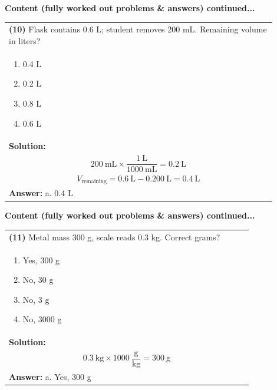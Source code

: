 \documentclass{article}
\begin{document}
{\newpage
\noindent
{\large\textbf{Content (fully worked out problems \& answers) continued...}}\\[0.2em]
\vspace{0.2cm}
\begin{tabular}{|p{0.9\linewidth}|}
\hline
\vspace{0.2cm}
\textbf{(10)} Flask contains 0.6 L; student removes 200 mL. Remaining volume in liters? \\
\begin{minipage}[t]{0.85\linewidth}
\begin{enumerate}[label=\alph*.]
   \item 0.4 L
   \item 0.2 L
   \item 0.8 L
   \item 0.6 L
\end{enumerate}
\end{minipage}\\
\hline
\vspace{0.2cm}
\textbf{Solution:} \\
\[
200~\text{mL} \times \frac{1~\text{L}}{1000~\text{mL}} = 0.2~\text{L}
\] \\
\[
V_\text{remaining} = 0.6~\text{L} - 0.200~\text{L} = 0.4~\text{L}
\] \\ 
\hline
\vspace{0.2cm}
\textbf{Answer:} a. 0.4 L \\
\hline
\end{tabular}

\newpage
\noindent
{\large\textbf{Content (fully worked out problems \& answers) continued...}}\\[0.2em]
\vspace{0.2cm}
\begin{tabular}{|p{0.9\linewidth}|}
\hline
\vspace{0.2cm}
\textbf{(11)} Metal mass 300 g, scale reads 0.3 kg. Correct grams? \\
\begin{minipage}[t]{0.85\linewidth}
\begin{enumerate}[label=\alph*.]
   \item Yes, 300 g
   \item No, 30 g
   \item No, 3 g
   \item No, 3000 g
\end{enumerate}
\end{minipage}\\
\hline
\vspace{0.2cm}
\textbf{Solution:} \\
\[
0.3~\text{kg} \times 1000~\frac{\text{g}}{\text{kg}} = 300~\text{g}
\] \\ 
\hline
\vspace{0.2cm}
\textbf{Answer:} a. Yes, 300 g \\
\hline
\end{tabular}

}
\end{document}
